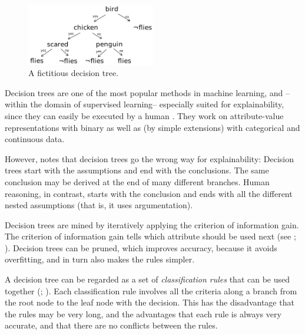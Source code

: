 \label{sec:decision-trees}

\begin{figure}[htb]
        \centering
        \includegraphics[width=0.5\textwidth]{images/decision-tree.png}
        \caption{A fictitious decision tree.}
        \label{fig:decision-tree}
\end{figure}

Decision trees are one of the most popular methods in machine learning, and --within the domain of supervised learning-- especially suited for explainability, since they can easily be executed by a human \cite[ch.~18.3]{russellArtificialIntelligenceModern2010}. They work on attribute-value representations with binary as well as (by simple extensions) with categorical and continuous data.

However, \citet{breidenbachTextCode2021} notes that decision trees go the wrong way for explainability: Decision trees start with the assumptions and end with the conclusions. The same conclusion may be derived at the end of many different branches. Human reasoning, in contrast, starts with the conclusion and ends with all the different nested assumptions (that is, it uses argumentation). 

Decision trees are mined by iteratively applying the criterion of information gain. The criterion of information gain tells which attribute should be used next (see \citet[ch.~18.3]{russellArtificialIntelligenceModern2010}; \citet[ch.~4.3]{wittenDataMiningPractical2017}). Decision trees can be pruned, which improves accuracy, because it avoids overfitting, and in turn also makes the rules simpler. 

A decision tree can be regarded as a set of \textit{classification rules} that can be used together (\citet[ch.~3.4]{wittenDataMiningPractical2017}; \citet[p.~358]{hanDataMiningConcepts2011}). Each classification rule involves all the criteria along a branch from the root node to the leaf node with the decision. This has the disadvantage that the rules may be very long, and the advantages that each rule is always very accurate, and that there are no conflicts between the rules.

